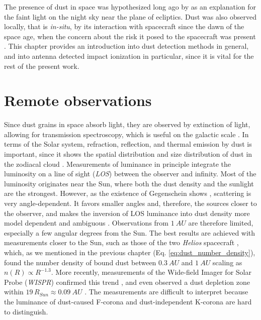 The presence of dust in space was hypothesized long ago by \citet{cassini1685} as an explanation for the faint light on the night sky near the plane of ecliptics. Dust was also observed locally, that is \textit{in-situ}, by its interaction with spacecraft since the dawn of the space age, when the concern about the risk it posed to the spacecraft was present \citep{whipple1958meteoritic}. This chapter provides an introduction into dust detection methods in general, and into antenna detected impact ionization in particular, since it is vital for the rest of the present work.

\section{Remote observations}

Since dust grains in space absorb light, they are observed by extinction of light, \citep{desert1990interstellar} allowing for transmission spectroscopy, which is useful on the galactic scale \citep{mann2010interstellar}. In terms of the Solar system, refraction, reflection, and thermal emission by dust is important, since it shows the spatial distribution and size distribution of dust in the zodiacal cloud \citep{allen1946spectrum,hulst1947zodiacal,leinert1981zodiacal,stenborg2018characterization,stenborg2021psp}. Measurements of luminance in principle integrate the luminosity on a line of sight (\textit{LOS}) between the observer and infinity. Most of the luminosity originates near the Sun, where both the dust density and the sunlight are the strongest. However, as the existence of Gegenschein shows \citep{roosen1971gegenschein}, scattering is very angle-dependent. It favors smaller angles and, therefore, the sources closer to the observer, and makes the inversion of LOS luminance into dust density more model dependent and ambiguous \citep{mann2004dust,kneissel1991spatial}. Observations from $\SI{1}{AU}$ are therefore limited, especially a few angular degrees from the Sun. The best results are achieved with measurements closer to the Sun, such as those of the two \textit{Helios} spacecraft \cite{leinert1981zodiacal}, which, as we mentioned in the previous chapter (Eq. \ref{eq:dust_number_density}), found the number density of bound dust between $\SI{0.3}{AU}$ and $\SI{1}{AU}$ scaling as $n(R) \propto R^{-1.3}$. More recently, measurements of the Wide-field Imager for Solar Probe (\textit{WISPR}) confirmed this trend \citep{stenborg2021psp}, and even observed a dust depletion zone within $19 \, R_{Sun} \approx \SI{0.09}{AU}$ \citep{stenborg2022psp}. The measurements are difficult to interpret because the luminance of dust-caused F-corona and dust-independent K-corona are hard to distinguish. 

